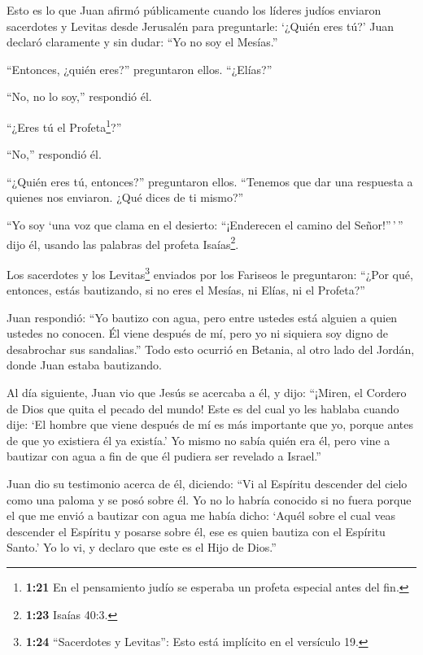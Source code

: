  Esto es lo que Juan afirmó públicamente cuando los líderes
judíos enviaron sacerdotes y Levitas desde Jerusalén para preguntarle:
`¿Quién eres tú?'  Juan declaró claramente y sin dudar:
``Yo no soy el Mesías.''

 ``Entonces, ¿quién eres?'' preguntaron ellos. ``¿Elías?''

``No, no lo soy,'' respondió él.

``¿Eres tú el Profeta\footnote{\textbf{1:21} En el pensamiento judío se
  esperaba un profeta especial antes del fin.}?''

``No,'' respondió él.

 ``¿Quién eres tú, entonces?'' preguntaron ellos. ``Tenemos
que dar una respuesta a quienes nos enviaron. ¿Qué dices de ti mismo?''

 ``Yo soy `una voz que clama en el desierto: ``¡Enderecen
el camino del Señor!''\,'\,'' dijo él, usando las palabras del profeta
Isaías\footnote{\textbf{1:23} Isaías 40:3.}.

 Los sacerdotes y los Levitas\footnote{\textbf{1:24}
  ``Sacerdotes y Levitas'': Esto está implícito en el versículo 19.}
enviados por los Fariseos  le preguntaron: ``¿Por qué,
entonces, estás bautizando, si no eres el Mesías, ni Elías, ni el
Profeta?''

 Juan respondió: ``Yo bautizo con agua, pero entre ustedes
está alguien a quien ustedes no conocen.  Él viene después
de mí, pero yo ni siquiera soy digno de desabrochar sus sandalias.''
 Todo esto ocurrió en Betania, al otro lado del Jordán,
donde Juan estaba bautizando.

 Al día siguiente, Juan vio que Jesús se acercaba a él, y
dijo: ``¡Miren, el Cordero de Dios que quita el pecado del mundo!
 Este es del cual yo les hablaba cuando dije: `El hombre
que viene después de mí es más importante que yo, porque antes de que yo
existiera él ya existía.'  Yo mismo no sabía quién era él,
pero vine a bautizar con agua a fin de que él pudiera ser revelado a
Israel.''

 Juan dio su testimonio acerca de él, diciendo: ``Vi al
Espíritu descender del cielo como una paloma y se posó sobre él.
 Yo no lo habría conocido si no fuera porque el que me
envió a bautizar con agua me había dicho: `Aquél sobre el cual veas
descender el Espíritu y posarse sobre él, ese es quien bautiza con el
Espíritu Santo.'  Yo lo vi, y declaro que este es el Hijo
de Dios.''

